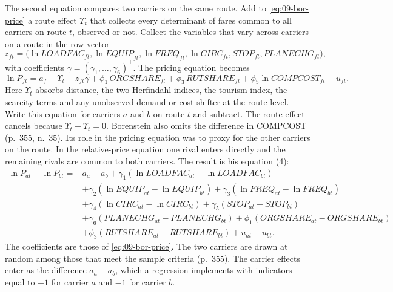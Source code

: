  The second equation compares two carriers on the same route. Add to
\cref{eq:09-bor-price} a route effect $\Upsilon_t$ that collects every determinant of fares common to all carriers
on route $t$, observed or not. Collect the variables that vary across carriers on a route in the row vector
\begin{equation*}
z_{ft} = \big(\ln \mathit{LOADFAC}_{ft}, \ln \mathit{EQUIP}_{ft}, \ln \mathit{FREQ}_{ft}, \ln \mathit{CIRC}_{ft},
\mathit{STOP}_{ft}, \mathit{PLANECHG}_{ft}\big),
\end{equation*}
with coefficients $\gamma = (\gamma_1, \dots, \gamma_6)^\top$. The pricing equation becomes
\begin{equation*}
\ln P_{ft} = a_f + \Upsilon_t + z_{ft}\gamma + \phi_1\, \mathit{ORGSHARE}_{ft} + \phi_3\, \mathit{RUTSHARE}_{ft}
+ \phi_5 \ln \mathit{COMPCOST}_{ft} + u_{ft} .
\end{equation*}
Here $\Upsilon_t$ absorbs distance, the two Herfindahl indices, the tourism index, the scarcity terms and any
unobserved demand or cost shifter at the route level. Write this equation for carriers $a$ and $b$ on route $t$
and subtract. The route effect cancels because $\Upsilon_t - \Upsilon_t = 0$. Borenstein also omits the difference in
COMPCOST (p.~355, n.~35). Its role in the pricing equation was to proxy for the other carriers on the route. In
the relative-price equation one rival enters directly and the remaining rivals are common to both carriers. The
result is his equation (4):
\begin{equation}\label{eq:09-bor-rel}
\begin{aligned}
\ln P_{at} - \ln P_{bt} = {} & a_a - a_b + \gamma_1 (\ln \mathit{LOADFAC}_{at} - \ln \mathit{LOADFAC}_{bt}) \\
& + \gamma_2 (\ln \mathit{EQUIP}_{at} - \ln \mathit{EQUIP}_{bt})
  + \gamma_3 (\ln \mathit{FREQ}_{at} - \ln \mathit{FREQ}_{bt}) \\
& + \gamma_4 (\ln \mathit{CIRC}_{at} - \ln \mathit{CIRC}_{bt})
  + \gamma_5 (\mathit{STOP}_{at} - \mathit{STOP}_{bt}) \\
& + \gamma_6 (\mathit{PLANECHG}_{at} - \mathit{PLANECHG}_{bt})
  + \phi_1 (\mathit{ORGSHARE}_{at} - \mathit{ORGSHARE}_{bt}) \\
& + \phi_3 (\mathit{RUTSHARE}_{at} - \mathit{RUTSHARE}_{bt}) + u_{at} - u_{bt} .
\end{aligned}
\end{equation}
The coefficients are those of \cref{eq:09-bor-price}. The two carriers are drawn at random among those that meet
the sample criteria (p.~355). The carrier effects enter as the difference $a_a - a_b$, which a regression
implements with indicators equal to $+1$ for carrier $a$ and $-1$ for carrier $b$.

